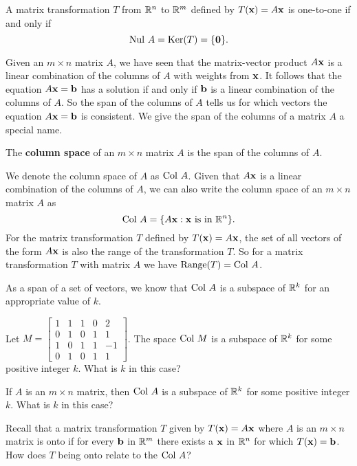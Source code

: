 \begin{theorem} \label{thm:3_b_one_to_one_kernel} A matrix transformation $T$ from $\mathbb{R}^n$ to $\mathbb{R}^m$ defined by $T(\mathbf{x}) = A\mathbf{x}$ is one-to-one if and only if 
\[\text{Nul } A = \text{Ker}(T) = \{\mathbf{0}\}.\] 
\end{theorem}


\label{sec:column_range}

Given an $m \times n$ matrix $A$, we have seen that the matrix-vector product $A \mathbf{x}$ is a linear combination of the columns of $A$ with weights from $\mathbf{x}$. It follows that the equation $A \mathbf{x} = \mathbf{b}$ has a solution if and only if $\mathbf{b}$ is a linear combination of the columns of $A$. So the span of the columns of $A$ tells us for which vectors the equation $A \mathbf{x} = \mathbf{b}$ is consistent. We give the span of the columns of a matrix $A$ a special name. 


\begin{definition} The \textbf{column space} of an $m \times n$ matrix $A$ is the span of the columns of $A$.
\end{definition}


We denote the column space of $A$ as $\text{Col } A$. Given that $A \mathbf{x}$ is a linear combination of the columns of $A$, we can also write the column space of an $m \times n$ matrix $A$ as
\[\text{Col } A = \{A \mathbf{x} : \mathbf{x} \text{ is in } \mathbb{R}^n\}.\]
For the matrix transformation $T$ defined by $T(\mathbf{x}) = A\mathbf{x}$, the set of all vectors of the form $A \mathbf{x}$ is also the range of the transformation $T$. So for a matrix transformation $T$ with matrix $A$ we have $\text{Range}(T) = \text{Col } A$. 

\begin{activity} \label{act:3_b_2} As a span of a set of vectors, we know that $\text{Col } A$ is a subspace of $\mathbb{R}^k$ for an appropriate value of $k$.  
\ba
\item Let $M =  \left[ \begin{array}{ccccr} 1&1&1&0&2 \\ 0&1&0&1&1 \\ 1&0&1&1&-1 \\ 0&1&0&1&1 \end{array} \right]$. 
The space $\text{Col } M$ is a subspace of $\mathbb{R}^k$ for some positive integer $k$. What is $k$ in this case?


\item If $A$ is an $m \times n$ matrix, then $\text{Col } A$ is a subspace of $\mathbb{R}^k$ for some positive integer $k$. What is $k$ in this case?


\item Recall that a matrix transformation $T$ given by $T(\mathbf{x})=A\mathbf{x}$ where $A$ is an $m\times n$ matrix is onto if for every $\mathbf{b}$ in $\mathbb{R}^m$ there exists a $\mathbf{x}$ in $\mathbb{R}^n$ for which $T(\mathbf{x})=\mathbf{b}$. How does $T$ being onto relate to the $\text{Col } A$? 


\ea
\end{activity}

